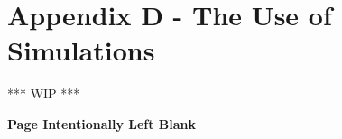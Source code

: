 \section{Appendix D - The Use of Simulations}
\label{sec:Appendix_D}
\textcolor{commentGreen}{*** WIP ***}

\textbf{Page Intentionally Left Blank}